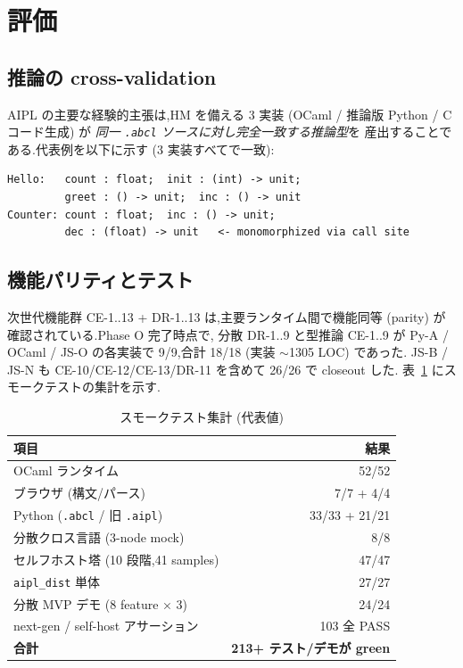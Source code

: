 \documentclass[11pt,a4paper]{article}
\newcommand{\code}[1]{\texttt{\small #1}}
\begin{document}
\section{評価}\label{sec:eval}

\subsection{推論の cross-validation}
AIPL の主要な経験的主張は,HM を備える 3 実装
(OCaml / 推論版 Python / C コード生成) が
\emph{同一 \code{.abcl} ソースに対し完全一致する推論型}を
産出することである.代表例を以下に示す
(3 実装すべてで一致):
\begin{verbatim}
Hello:   count : float;  init : (int) -> unit;
         greet : () -> unit;  inc : () -> unit
Counter: count : float;  inc : () -> unit;
         dec : (float) -> unit   <- monomorphized via call site
\end{verbatim}

\subsection{機能パリティとテスト}
次世代機能群 CE-1..13 + DR-1..13 は,主要ランタイム間で機能同等
(parity) が確認されている.Phase O 完了時点で,
分散 DR-1..9 と型推論 CE-1..9 が Py-A / OCaml / JS-O の各実装で
9/9,合計 18/18 (実装 $\sim$1305 LOC) であった.
JS-B / JS-N も CE-10/CE-12/CE-13/DR-11 を含めて 26/26 で closeout した.
表~\ref{tab:smoke} にスモークテストの集計を示す.

\begin{table}[h]
\centering\small
\caption{スモークテスト集計 (代表値)}\label{tab:smoke}
\begin{tabularx}{\linewidth}{@{}X r@{}}
\toprule
項目 & 結果 \\
\midrule
OCaml ランタイム & 52/52 \\
ブラウザ (構文/パース) & 7/7 + 4/4 \\
Python (\code{.abcl} / 旧 \code{.aipl}) & 33/33 + 21/21 \\
分散クロス言語 (3-node mock) & 8/8 \\
セルフホスト塔 (10 段階,41 samples) & 47/47 \\
\code{aipl\_dist} 単体 & 27/27 \\
分散 MVP デモ (8 feature × 3) & 24/24 \\
next-gen / self-host アサーション & 103 全 PASS \\
\midrule
\textbf{合計} & \textbf{213+ テスト/デモが green} \\
\bottomrule
\end{tabularx}
\end{table}
\end{document}
